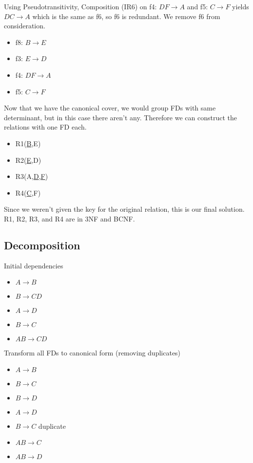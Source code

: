 \documentclass[a4paper]{article}
\begin{document}
Using Pseudotransitivity, Composition (IR6) on f4: $DF \rightarrow A$ and f5: $C \rightarrow F$ yields $DC \rightarrow A$ which is the same as f6, so f6 is redundant. We remove f6 from consideration.

\begin{itemize}
    \item f8: $B \rightarrow E$
    \item f3: $E \rightarrow D$
    \item f4: $DF \rightarrow A$
    \item f5: $C \rightarrow F$
\end{itemize}

Now that we have the canonical cover, we would group FDs with same determinant, but in this case there aren't any. Therefore we can construct the relations with one FD each.

\begin{itemize}
    \item R1(\underline{B},E)
    \item R2(\underline{E},D)
    \item R3(A,\underline{D},\underline{F})
    \item R4(\underline{C},F)
\end{itemize}

Since we weren't given the key for the original relation, this is our final solution. R1, R2, R3, and R4 are in 3NF and BCNF.



\subsection{Decomposition}
Initial dependencies

\begin{itemize}
    \item $A \rightarrow B$
    \item $B \rightarrow CD$
    \item $A \rightarrow D$
    \item $B \rightarrow C$
    \item $AB \rightarrow CD$
\end{itemize}

Transform all FDs to canonical form (removing duplicates)

\begin{itemize}
    \item $A \rightarrow B$
    \item $B \rightarrow C$
    \item $B \rightarrow D$
    \item $A \rightarrow D$
    \item \sout{$B \rightarrow C$} duplicate
    \item $AB \rightarrow C$
    \item $AB \rightarrow D$
\end{itemize}
\end{document}
